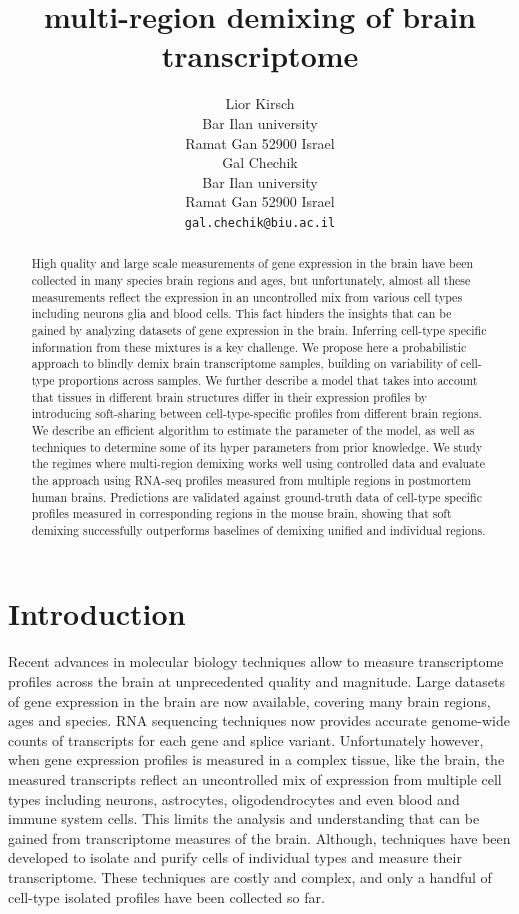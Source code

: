 \documentclass{article} %
\title{multi-region demixing of brain transcriptome}
\author{
Lior Kirsch \\ Bar Ilan university \\ Ramat Gan 52900 Israel \\ 
\And
Gal Chechik \\ Bar Ilan university \\ Ramat Gan 52900 Israel \\
\texttt{gal.chechik@biu.ac.il} \\
}
\begin{document}
\maketitle
\begin{abstract}
    High quality and large scale measurements of gene expression in the brain have been collected in many species brain regions and ages, but unfortunately, almost all these measurements reflect the expression in an uncontrolled mix from various cell types including neurons glia and blood cells. This fact hinders the insights that can be gained by analyzing datasets of gene expression in the brain. Inferring cell-type specific information from these mixtures is a key challenge. We propose here a probabilistic approach to blindly demix brain transcriptome samples, building on variability of cell-type proportions across samples. We further describe a model that takes into account that tissues in different brain structures differ in their expression profiles by introducing soft-sharing between cell-type-specific profiles from different brain regions. We describe an efficient algorithm to estimate the parameter of the model, as well as techniques to determine some of its hyper parameters from prior knowledge. We study the regimes where multi-region demixing works well using controlled data and evaluate the approach using RNA-seq profiles measured from multiple regions in postmortem human brains. Predictions are validated against ground-truth data of cell-type specific profiles measured in corresponding regions in the mouse brain, showing that soft demixing successfully outperforms baselines of demixing unified and individual regions. 
\end{abstract}

\section{Introduction}
\label{introduction}
Recent advances in molecular biology techniques allow to measure transcriptome profiles across the brain at unprecedented quality and magnitude. Large datasets of gene expression in the brain are now available, covering  many brain regions, ages and species. RNA sequencing techniques now provides accurate genome-wide counts of transcripts for each gene and splice variant. Unfortunately however, when gene expression profiles is measured in a complex tissue, like the brain, the measured transcripts reflect an uncontrolled mix of expression from multiple cell types including neurons, astrocytes, oligodendrocytes and even blood and immune system cells. This limits the analysis and understanding that can be gained from transcriptome measures of the brain. Although, techniques have been developed to isolate and purify cells of individual types and measure their transcriptome. These techniques are costly and complex, and only a handful of cell-type isolated profiles have been collected so far. 
\end{document}
